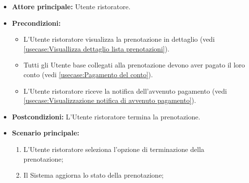 \label{usecase:Termina prenotazione}
\begin{itemize}
	\item \textbf{Attore principale:} Utente ristoratore.

	\item \textbf{Precondizioni:}
	      \begin{itemize}
		      \item L'Utente ristoratore visualizza la prenotazione in dettaglio (vedi \autoref{usecase:Visuallizza dettaglio lista prenotazioni}).
		      \item Tutti gli Utente base collegati alla prenotazione devono aver pagato il loro conto (vedi \autoref{usecase:Pagamento del conto}).
		      \item L'Utente ristoratore riceve la notifica dell'avvenuto pagamento (vedi \autoref{usecase:Visualizzazione notifica di avvenuto pagamento}).
	      \end{itemize}

	\item \textbf{Postcondizioni:} L'Utente ristoratore termina la prenotazione.


	\item \textbf{Scenario principale:}
	      \begin{enumerate}
		      \item L'Utente ristoratore seleziona l'opzione di terminazione della prenotazione;

		      \item Il Sistema aggiorna lo stato della prenotazione;
	      \end{enumerate}
\end{itemize}
